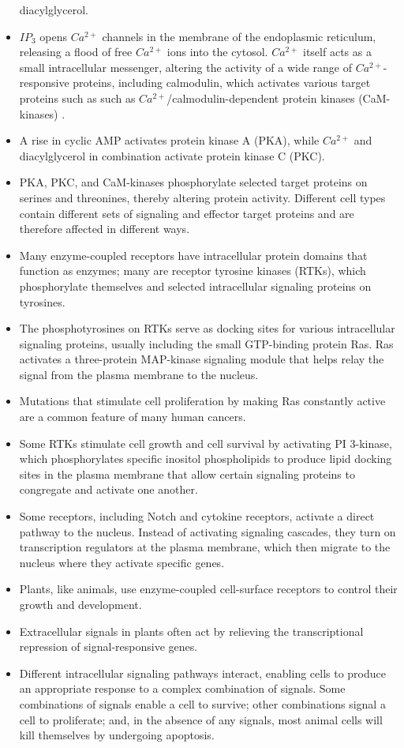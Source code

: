 \begin{itemize}
diacylglycerol.
\item $IP_3$ opens $Ca^{2+}$ channels in the membrane of the endoplasmic reticulum,
releasing a flood of free $Ca^{2+}$ ions into the cytosol. $Ca^{2+}$ itself
acts as a small intracellular messenger, altering the activity of a
wide range of $Ca^{2+}$-responsive proteins, including calmodulin, which
activates various target proteins such as such as $Ca^{2+}$/calmodulin-dependent
protein kinases (CaM-kinases) .
\item A rise in cyclic AMP activates protein kinase A (PKA), while $Ca^{2+}$ and
diacylglycerol in combination activate protein kinase C (PKC).
\item PKA, PKC, and CaM-kinases phosphorylate selected target proteins
on serines and threonines, thereby altering protein activity. Different
cell types contain different sets of signaling and effector target proteins
and are therefore affected in different ways.
\item Many enzyme-coupled receptors have intracellular protein domains
that function as enzymes; many are receptor tyrosine kinases (RTKs),
which phosphorylate themselves and selected intracellular signaling
proteins on tyrosines.
\item The phosphotyrosines on RTKs serve as docking sites for various intracellular
signaling proteins, usually including the small GTP-binding
protein Ras. Ras activates a three-protein MAP-kinase signaling
module that helps relay the signal from the plasma membrane to the
nucleus.
\item Mutations that stimulate cell proliferation by making Ras constantly
active are a common feature of many human cancers.
\item Some RTKs stimulate cell growth and cell survival by activating PI
3-kinase, which phosphorylates specific inositol phospholipids to
produce lipid docking sites in the plasma membrane that allow certain
signaling proteins to congregate and activate one another.
\item Some receptors, including Notch and cytokine receptors, activate
a direct pathway to the nucleus. Instead of activating signaling
cascades, they turn on transcription regulators at the plasma membrane,
which then migrate to the nucleus where they activate specific
genes.
\item Plants, like animals, use enzyme-coupled cell-surface receptors to
control their growth and development.
\item Extracellular signals in plants often act by relieving the transcriptional
repression of signal-responsive genes.
\item Different intracellular signaling pathways interact, enabling cells to
produce an appropriate response to a complex combination of signals.
Some combinations of signals enable a cell to survive; other combinations
signal a cell to proliferate; and, in the absence of any signals,
most animal cells will kill themselves by undergoing apoptosis.
\end{itemize}

